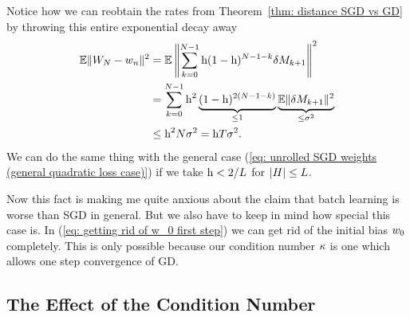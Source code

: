 Notice how we can reobtain the rates from Theorem~\ref{thm: distance SGD vs GD}
by throwing this entire exponential decay away
\begin{align*}
	\mathbb{E}\|W_N-w_n\|^2
	&= \mathbb{E}\left\|\sum_{k=0}^{N-1}\text{h}(1-\text{h})^{N-1-k}\delta M_{k+1}\right\|^2\\
	&= \sum_{k=0}^{N-1}\text{h}^2\underbrace{(1-\text{h})^{2(N-1-k)}}_{\le1}
	\underbrace{\mathbb{E}\|\delta M_{k+1}\|^2}_{\le \sigma^2}\\
	&\le \text{h}^2 N \sigma^2 = \text{h} T\sigma^2.
\end{align*}
We can do the same thing with the general case (\ref{eq: unrolled SGD weights
(general quadratic loss case)}) if we take \(\text{h}<2/L\) for \(|H|\le L\).

Now this fact is making me quite anxious about the claim that batch learning is
worse than SGD in general. But we also have to keep in mind how special this
case is. In (\ref{eq: getting rid of w_0 first step}) we can get rid of the
initial bias \(w_0\) completely. This is only possible because our
condition number \(\kappa\) is one which allows one step convergence of GD.

\subsection{The Effect of the Condition Number}

